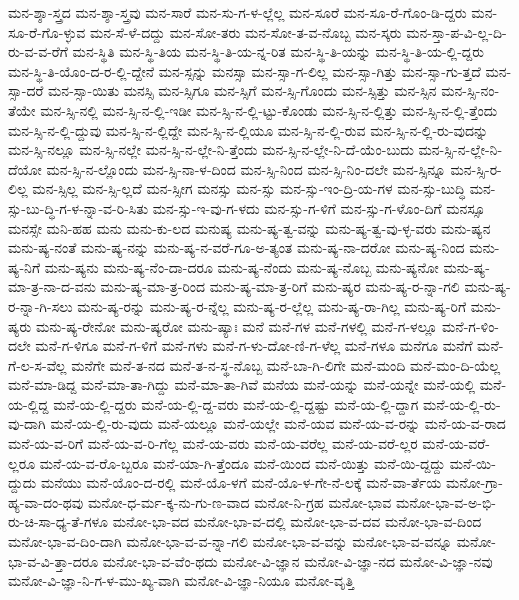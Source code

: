 {ಮನ-ಶ್ಶಾ-ಸ್ತ್ರದ
ಮನ-ಶ್ಶಾ-ಸ್ತ್ರವು
ಮನ-ಸಾರೆ
ಮನ-ಸು-ಗ-ಳ-ಲ್ಲೆಲ್ಲ
ಮನ-ಸೂರೆ
ಮನ-ಸೂ-ರೆ-ಗೊಂ-ಡಿ-ದ್ದರು
ಮನ-ಸೂ-ರೆ-ಗೊ-ಳ್ಳುವ
ಮನ-ಸೆ-ಳೆ-ದದ್ದು
ಮನ-ಸೋ-ತರು
ಮನ-ಸೋ-ತ-ವ-ನೊಬ್ಬ
ಮನ-ಸ್ಕರು
ಮನ-ಸ್ತಾ-ಪ-ವಿ-ಲ್ಲ-ದಿ-ರು-ವ-ವ-ರೆಗೆ
ಮನ-ಸ್ಥಿತಿ
ಮನ-ಸ್ಥಿ-ತಿಯ
ಮನ-ಸ್ಥಿ-ತಿ-ಯ-ನ್ನ-ರಿತ
ಮನ-ಸ್ಥಿ-ತಿ-ಯನ್ನು
ಮನ-ಸ್ಥಿ-ತಿ-ಯ-ಲ್ಲಿ-ದ್ದರು
ಮನ-ಸ್ಥಿ-ತಿ-ಯೊಂ-ದ-ರ-ಲ್ಲಿ-ದ್ದೇನೆ
ಮನ-ಸ್ಸನ್ನು
ಮನಸ್ಸಾ
ಮನ-ಸ್ಸಾ-ಗ-ಲಿಲ್ಲ
ಮನ-ಸ್ಸಾ-ಗಿತ್ತು
ಮನ-ಸ್ಸಾ-ಗು-ತ್ತದೆ
ಮನ-ಸ್ಸಾ-ದರೆ
ಮನ-ಸ್ಸಾ-ಯಿತು
ಮನಸ್ಸಿ
ಮನ-ಸ್ಸಿಗೂ
ಮನ-ಸ್ಸಿಗೆ
ಮನ-ಸ್ಸಿ-ಗೊಂದು
ಮನ-ಸ್ಸಿತ್ತು
ಮನ-ಸ್ಸಿನ
ಮನ-ಸ್ಸಿ-ನಂ-ತೆಯೇ
ಮನ-ಸ್ಸಿ-ನಲ್ಲಿ
ಮನ-ಸ್ಸಿ-ನ-ಲ್ಲಿ-ಇಡೀ
ಮನ-ಸ್ಸಿ-ನ-ಲ್ಲಿ-ಟ್ಟು-ಕೊಂಡು
ಮನ-ಸ್ಸಿ-ನ-ಲ್ಲಿತ್ತು
ಮನ-ಸ್ಸಿ-ನ-ಲ್ಲಿ-ತ್ತೆಂದು
ಮನ-ಸ್ಸಿ-ನ-ಲ್ಲಿ-ದ್ದುವು
ಮನ-ಸ್ಸಿ-ನ-ಲ್ಲಿದ್ದೇ
ಮನ-ಸ್ಸಿ-ನ-ಲ್ಲಿಯೂ
ಮನ-ಸ್ಸಿ-ನ-ಲ್ಲಿ-ರುವ
ಮನ-ಸ್ಸಿ-ನ-ಲ್ಲಿ-ರು-ವುದನ್ನು
ಮನ-ಸ್ಸಿ-ನಲ್ಲೂ
ಮನ-ಸ್ಸಿ-ನಲ್ಲೇ
ಮನ-ಸ್ಸಿ-ನ-ಲ್ಲೇ-ನಿ-ತ್ತೆಂದು
ಮನ-ಸ್ಸಿ-ನ-ಲ್ಲೇ-ನಿ-ದೆ-ಯೆಂ-ಬುದು
ಮನ-ಸ್ಸಿ-ನ-ಲ್ಲೇ-ನಿ-ದೆಯೋ
ಮನ-ಸ್ಸಿ-ನ-ಲ್ಲೊಂದು
ಮನ-ಸ್ಸಿ-ನಾ-ಳ-ದಿಂದ
ಮನ-ಸ್ಸಿ-ನಿಂದ
ಮನ-ಸ್ಸಿ-ನಿಂ-ದಲೇ
ಮನ-ಸ್ಸಿನ್ನೂ
ಮನ-ಸ್ಸಿ-ರ-ಲಿಲ್ಲ
ಮನ-ಸ್ಸಿಲ್ಲ
ಮನ-ಸ್ಸಿ-ಲ್ಲದೆ
ಮನ-ಸ್ಸೀಗ
ಮನಸ್ಸು
ಮನ-ಸ್ಸು
ಮನ-ಸ್ಸು-ಇಂ-ದ್ರಿ-ಯ-ಗಳ
ಮನ-ಸ್ಸು-ಬುದ್ಧಿ
ಮನ-ಸ್ಸು-ಬು-ದ್ಧಿ-ಗ-ಳ-ನ್ನಾ-ವ-ರಿ-ಸಿತು
ಮನ-ಸ್ಸು-ಇ-ವು-ಗ-ಳದು
ಮನ-ಸ್ಸು-ಗ-ಳಿಗೆ
ಮನ-ಸ್ಸು-ಗ-ಳೊಂ-ದಿಗೆ
ಮನಸ್ಸೂ
ಮನಸ್ಸೇ
ಮನಿ-ಹಹ
ಮನು
ಮನು-ಕು-ಲದ
ಮನುಷ್ಯ
ಮನು-ಷ್ಯ-ತ್ವ-ವನ್ನು
ಮನು-ಷ್ಯ-ತ್ವ-ವು-ಳ್ಳ-ವರು
ಮನು-ಷ್ಯನ
ಮನು-ಷ್ಯ-ನಂತೆ
ಮನು-ಷ್ಯ-ನನ್ನು
ಮನು-ಷ್ಯ-ನ-ವರೆ-ಗೂ-ಅ-ತ್ಯಂತ
ಮನು-ಷ್ಯ-ನಾ-ದರೋ
ಮನು-ಷ್ಯ-ನಿಂದ
ಮನು-ಷ್ಯ-ನಿಗೆ
ಮನು-ಷ್ಯನು
ಮನು-ಷ್ಯ-ನೆಂ-ದಾ-ದರೂ
ಮನು-ಷ್ಯ-ನೆಂದು
ಮನು-ಷ್ಯ-ನೊಬ್ಬ
ಮನು-ಷ್ಯನೋ
ಮನು-ಷ್ಯ-ಮಾ-ತ್ರ-ನಾ-ದ-ವನು
ಮನು-ಷ್ಯ-ಮಾ-ತ್ರ-ರಿಂದ
ಮನು-ಷ್ಯ-ಮಾ-ತ್ರ-ರಿಗೆ
ಮನು-ಷ್ಯರ
ಮನು-ಷ್ಯ-ರ-ನ್ನಾ-ಗಲಿ
ಮನು-ಷ್ಯ-ರ-ನ್ನಾ-ಗಿ-ಸಲು
ಮನು-ಷ್ಯ-ರನ್ನು
ಮನು-ಷ್ಯ-ರ-ನ್ನೆಲ್ಲ
ಮನು-ಷ್ಯ-ರ-ಲ್ಲೆಲ್ಲ
ಮನು-ಷ್ಯ-ರಾ-ಗಿಲ್ಲ
ಮನು-ಷ್ಯ-ರಿಗೆ
ಮನು-ಷ್ಯರು
ಮನು-ಷ್ಯ-ರೇನೋ
ಮನು-ಷ್ಯರೋ
ಮನು-ಷ್ಯಾಃ
ಮನೆ
ಮನೆ-ಗಳ
ಮನೆ-ಗಳಲ್ಲಿ
ಮನೆ-ಗ-ಳಲ್ಲೂ
ಮನೆ-ಗ-ಳಿಂ-ದಲೇ
ಮನೆ-ಗ-ಳಿಗೂ
ಮನೆ-ಗ-ಳಿಗೆ
ಮನೆ-ಗಳು
ಮನೆ-ಗ-ಳು-ದೋ-ಣಿ-ಗ-ಳೆಲ್ಲ
ಮನೆ-ಗಳೂ
ಮನೆಗೂ
ಮನೆಗೆ
ಮನೆ-ಗೆ-ಲ-ಸ-ವೆಲ್ಲ
ಮನೆಗೇ
ಮನೆ-ತ-ನದ
ಮನೆ-ತ-ನ-ಸ್ಥ-ನೊಬ್ಬ
ಮನೆ-ಬಾ-ಗಿ-ಲಿಗೇ
ಮನೆ-ಮಂದಿ
ಮನೆ-ಮಂ-ದಿ-ಯೆಲ್ಲ
ಮನೆ-ಮಾ-ಡಿದ್ದ
ಮನೆ-ಮಾ-ತಾ-ಗಿದ್ದು
ಮನೆ-ಮಾ-ತಾ-ಗಿವೆ
ಮನೆಯ
ಮನೆ-ಯನ್ನು
ಮನೆ-ಯನ್ನೇ
ಮನೆ-ಯಲ್ಲಿ
ಮನೆ-ಯ-ಲ್ಲಿದ್ದ
ಮನೆ-ಯ-ಲ್ಲಿ-ದ್ದರು
ಮನೆ-ಯ-ಲ್ಲಿ-ದ್ದ-ವರು
ಮನೆ-ಯ-ಲ್ಲಿ-ದ್ದಷ್ಟು
ಮನೆ-ಯ-ಲ್ಲಿ-ದ್ದಾಗ
ಮನೆ-ಯ-ಲ್ಲಿ-ರು-ವು-ದಾಗಿ
ಮನೆ-ಯ-ಲ್ಲಿ-ರು-ವುದು
ಮನೆ-ಯಲ್ಲೂ
ಮನೆ-ಯಲ್ಲೇ
ಮನೆ-ಯವ
ಮನೆ-ಯ-ವ-ರನ್ನು
ಮನೆ-ಯ-ವ-ರಾದ
ಮನೆ-ಯ-ವ-ರಿಗೆ
ಮನೆ-ಯ-ವ-ರಿ-ಗೆಲ್ಲ
ಮನೆ-ಯ-ವರು
ಮನೆ-ಯ-ವರೆಲ್ಲ
ಮನೆ-ಯ-ವರೆ-ಲ್ಲರ
ಮನೆ-ಯ-ವರೆ-ಲ್ಲರೂ
ಮನೆ-ಯ-ವ-ರೊ-ಬ್ಬರೂ
ಮನೆ-ಯಾ-ಗಿ-ತ್ತೆಂದೂ
ಮನೆ-ಯಿಂದ
ಮನೆ-ಯಿತ್ತು
ಮನೆ-ಯಿ-ದ್ದದ್ದು
ಮನೆ-ಯಿ-ದ್ದುದು
ಮನೆಯು
ಮನೆ-ಯೊಂ-ದ-ರಲ್ಲಿ
ಮನೆ-ಯೊ-ಳಗೆ
ಮನೆ-ಯೊ-ಳ-ಗೇ-ನೆ-ಲಕ್ಕೆ
ಮನೆ-ವಾ-ರ್ತೆಯ
ಮನೋ-ಗ್ರಾ-ಹ್ಯ-ವಾ-ದಂ-ಥವು
ಮನೋ-ಧ-ರ್ಮ-ಕ್ಕ-ನು-ಗು-ಣ-ವಾದ
ಮನೋ-ನಿ-ಗ್ರಹ
ಮನೋ-ಭಾವ
ಮನೋ-ಭಾ-ವ-ಅ-ಭಿ-ರು-ಚಿ-ಸಾ-ಧ್ಯ-ತೆ-ಗಳೂ
ಮನೋ-ಭಾ-ವದ
ಮನೋ-ಭಾ-ವ-ದಲ್ಲಿ
ಮನೋ-ಭಾ-ವ-ದವ
ಮನೋ-ಭಾ-ವ-ದಿಂದ
ಮನೋ-ಭಾ-ವ-ದಿಂ-ದಾಗಿ
ಮನೋ-ಭಾ-ವ-ವ-ನ್ನಾ-ಗಲಿ
ಮನೋ-ಭಾ-ವ-ವನ್ನು
ಮನೋ-ಭಾ-ವ-ವನ್ನೂ
ಮನೋ-ಭಾ-ವ-ವಿ-ತ್ತಾ-ದರೂ
ಮನೋ-ಭಾ-ವ-ವೆಂ-ಥದು
ಮನೋ-ವಿ-ಜ್ಞಾನ
ಮನೋ-ವಿ-ಜ್ಞಾ-ನದ
ಮನೋ-ವಿ-ಜ್ಞಾ-ನವು
ಮನೋ-ವಿ-ಜ್ಞಾ-ನಿ-ಗ-ಳ-ಮು-ಖ್ಯ-ವಾಗಿ
ಮನೋ-ವಿ-ಜ್ಞಾ-ನಿಯೂ
ಮನೋ-ವೃತ್ತಿ
}
